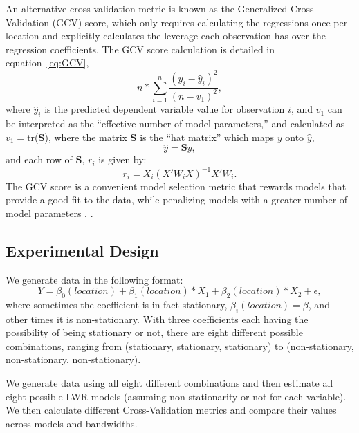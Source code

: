\documentclass{article}\usepackage[]{graphicx}\usepackage[]{color}
\begin{document}
An alternative cross validation metric is known as the Generalized Cross Validation (GCV) score, which only requires calculating the regressions once per location and explicitly calculates the leverage each observation has over the regression coefficients. The GCV score calculation is detailed in equation~\eqref{eq:GCV},
\begin{equation}\label{eq:GCV}
n*\sum_{i=1}^{n}\frac{(y_i-\hat{y}_i)^2}{(n-v_1)^2}, 
\end{equation} 
where $\hat{y}_i$ is the predicted dependent variable value for observation $i$, and $v_1$ can be interpreted as the ``effective number of model parameters,'' and calculated as $v_1=$tr(\textbf{S}), where the matrix \textbf{S} is the ``hat matrix'' which maps $y$ onto $\hat{y}$,
                   \begin{equation}
                   \hat{y}=\textbf{S}y,
                   \end{equation}
                   and each row of \textbf{S}, $r_i$ is given by:
                  \begin{equation}
                   r_i=X_i(X'W_iX)^{-1}X'W_i.
                   \end{equation}
The GCV score is a convenient model selection metric that rewards models that provide a good fit to the data, while penalizing models with a greater number of model parameters \citep{Loader1999, McMillen2010}.  \citep{Paez2011, McMillen2010, McMillen2012}. 



\subsection{Experimental Design}

We generate data in the following format:
\begin{equation}
Y = \beta _0(location) + \beta _1(location) *X_1 + \beta _2(location) * X_2 + \epsilon ,
\end{equation}
where sometimes the coefficient is in fact stationary, $\beta _i(location) = \beta$, and other times it is non-stationary. With three coefficients each having the possibility of being stationary or not, there are eight different possible combinations, ranging from (stationary, stationary, stationary) to (non-stationary, non-stationary, non-stationary).

We generate data using all eight different combinations and then estimate all eight possible LWR models (assuming non-stationarity or not for each variable). We then calculate different Cross-Validation metrics and compare their values across models and bandwidths. 
\end{document}
